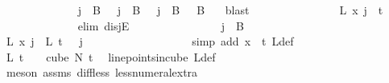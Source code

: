 \begin{isabellebody}
\ \ \ \ \ \ \ \ \ \ \ \ \isamarkupfalse%
\ {\isachardoublequoteopen}j\ {\isasymin}\ B\ {}\ {\isasymor}\ j\ {\isasymin}\ B\ {}\ {\isasymor}\ j\ {\isasymnotin}\ {\isacharparenleft}{\kern0pt}B\ {}\ {\isasymunion}\ B\ {}{\isacharparenright}{\kern0pt}{\isachardoublequoteclose}\ \isamarkupfalse%
\ blast\isanewline
\ \ \ \ \ \ \ \ \ \ \ \ \isamarkupfalse%
\ \isamarkupfalse%
\ {\isachardoublequoteopen}L{\isacharprime}{\kern0pt}\ x\ j\ {\isasymin}\ {\isacharbraceleft}{\kern0pt}{\isachardot}{\kern0pt}{\isachardot}{\kern0pt}{\isacharless}{\kern0pt}t\ {\isacharplus}{\kern0pt}\ {}{\isacharbraceright}{\kern0pt}{\isachardoublequoteclose}\isanewline
\ \ \ \ \ \ \ \ \ \ \ \ \isamarkupfalse%
\ {\isacharparenleft}{\kern0pt}elim\ disjE{\isacharparenright}{\kern0pt}\isanewline
\ \ \ \ \ \ \ \ \ \ \ \ \ \ \isamarkupfalse%
\ {\isachardoublequoteopen}j\ {\isasymin}\ B\ {}{\isachardoublequoteclose}\isanewline
\ \ \ \ \ \ \ \ \ \ \ \ \ \ \isamarkupfalse%
\ \isamarkupfalse%
\ {\isachardoublequoteopen}L{\isacharprime}{\kern0pt}\ x\ j\ {\isacharequal}{\kern0pt}\ L\ {\isacharparenleft}{\kern0pt}t\ {\isacharminus}{\kern0pt}\ {}{\isacharparenright}{\kern0pt}\ j{\isachardoublequoteclose}\ \isanewline
\ \ \ \ \ \ \ \ \ \ \ \ \ \ \ \ \isamarkupfalse%
\ {\isacharparenleft}{\kern0pt}simp\ add{\isacharcolon}{\kern0pt}\ {\isacartoucheopen}x\ {\isacharequal}{\kern0pt}\ t{\isacartoucheclose}\ L{\isacharprime}{\kern0pt}{\isacharunderscore}{\kern0pt}def{\isacharparenright}{\kern0pt}\isanewline
\ \ \ \ \ \ \ \ \ \ \ \ \ \ \isamarkupfalse%
\ {\isachardoublequoteopen}L\ {\isacharparenleft}{\kern0pt}t\ {\isacharminus}{\kern0pt}\ {}{\isacharparenright}{\kern0pt}\ {\isasymin}\ cube\ N{\isacharprime}{\kern0pt}\ t{\isachardoublequoteclose}\ \isamarkupfalse%
\ line{\isacharunderscore}{\kern0pt}points{\isacharunderscore}{\kern0pt}in{\isacharunderscore}{\kern0pt}cube\ L{\isacharunderscore}{\kern0pt}def\ \isanewline
\ \ \ \ \ \ \ \ \ \ \ \ \ \ \ \ \isamarkupfalse%
\ {\isacharparenleft}{\kern0pt}meson\ assms{\isacharparenleft}{\kern0pt}{}{\isacharparenright}{\kern0pt}\ diff{\isacharunderscore}{\kern0pt}less\ less{\isacharunderscore}{\kern0pt}numeral{\isacharunderscore}{\kern0pt}extra{\isacharparenleft}{\kern0pt}{}{\isacharparenright}{\kern0pt}{\isacharparenright}{\kern0pt}\isanewline
\ \ \ \ \ \ \ \ \ \ \ \ \ \ \isamarkupfalse%

\end{isabellebody}
